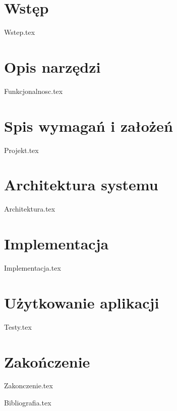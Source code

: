 \documentclass[12pt,a4paper,leqno,oneside,titlepage]{mwrep}
\begin{document}
\tableofcontents

\chapter{Wstęp}
{Wstep.tex}

\chapter{Opis narzędzi}
{Funkcjonalnosc.tex}

\chapter{Spis wymagań i założeń}
{Projekt.tex}

\chapter{Architektura systemu}
{Architektura.tex}

\chapter{Implementacja}
{Implementacja.tex}

\chapter{Użytkowanie aplikacji}
{Testy.tex}

\chapter{Zakończenie}
{Zakonczenie.tex}

{Bibliografia.tex}
\end{document}

